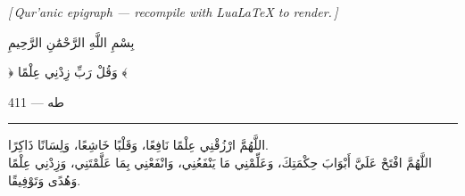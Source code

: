\documentclass[12pt,a4paper]{report}
\begin{document}
\hypersetup{pageanchor=true}

\thispagestyle{empty}
\color{black}
\vspace*{\fill}

\ifPDFTeX
  \begin{center}
    {\itshape\large
      [\,Qur'anic epigraph — recompile with LuaLaTeX to render.\,]}
  \end{center}
\else
  \begin{center}
  \begin{minipage}{0.78\linewidth}

    \begin{Arabic}
      \centering
      {\LARGE بِسْمِ اللَّهِ الرَّحْمَٰنِ الرَّحِيمِ}
    \end{Arabic}

    \vspace{2.2cm}

    \begin{Arabic}
      \centering
      {\fontsize{26}{34}\selectfont
        ﴿\; وَقُلْ رَبِّ زِدْنِي عِلْمًا \;﴾}
    \end{Arabic}

    \vspace{0.55cm}

\vspace*{\fill}

\hspace*{0.24\textwidth}
\begin{Arabic}
	{\normalsize طه — 411}
\end{Arabic}

\vspace*{\fill}

    \begin{center}
      {\color{black!35}\rule{0.38\linewidth}{0.35pt}}
    \end{center}

    \vspace{2.0cm}

    \begin{Arabic}
      \centering
      {\large اللَّهُمَّ ارْزُقْنِي عِلْمًا نَافِعًا،
               وَقَلْبًا خَاشِعًا،
               وَلِسَانًا ذَاكِرًا.\\
      اللَّهُمَّ افْتَحْ عَلَيَّ أَبْوَابَ حِكْمَتِكَ،
               وَعَلِّمْنِي مَا يَنْفَعُنِي،
               وَانْفَعْنِي بِمَا عَلَّمْتَنِي،
               وَزِدْنِي عِلْمًا وَهُدًى وَتَوْفِيقًا.}
    \end{Arabic}

  \end{minipage}
  \end{center}
\fi
\end{document}
